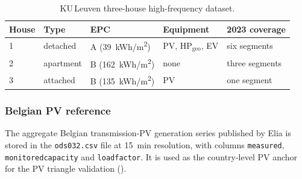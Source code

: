 \begin{table}[ht]
  \centering
  \footnotesize
  \caption{KU\,Leuven three-house high-frequency dataset.}
  \label{tab:kul_houses}
  \begin{tabular}{@{}l l l l l@{}}
    \toprule
    \textbf{House} & \textbf{Type} & \textbf{EPC} &
      \textbf{Equipment} & \textbf{2023 coverage} \\
    \midrule
    1 & detached
      & A (\SI{39}{kWh/m^2})
      & PV, $\text{HP}_\text{geo}$, EV
      & six segments \\
    2 & apartment
      & B (\SI{162}{kWh/m^2})
      & none
      & three segments \\
    3 & attached
      & B (\SI{135}{kWh/m^2})
      & PV
      & one segment \\
    \bottomrule
  \end{tabular}
\end{table}

\subsubsection*{Belgian PV reference} 
The aggregate Belgian transmission-PV generation series published by Elia \cite{Elia2024PVODS032} is stored in the \texttt{ods032.csv} file at \SI{15}{min} resolution, with columns \texttt{measured}, \texttt{monitoredcapacity} and \texttt{loadfactor}. It is used as the country-level PV anchor for the PV triangle validation ().




